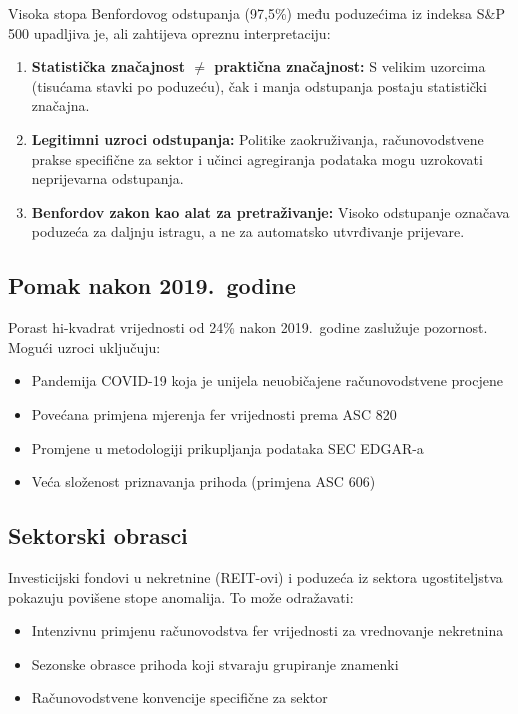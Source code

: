 \documentclass[12pt,a4paper]{article}
\begin{document}
Visoka stopa Benfordovog odstupanja (97,5\%) među poduzećima iz indeksa S\&P 500 upadljiva je, ali zahtijeva opreznu interpretaciju:

\begin{enumerate}
    \item \textbf{Statistička značajnost $\neq$ praktična značajnost:} S velikim uzorcima (tisućama stavki po poduzeću), čak i manja odstupanja postaju statistički značajna.

    \item \textbf{Legitimni uzroci odstupanja:} Politike zaokruživanja, računovodstvene prakse specifične za sektor i učinci agregiranja podataka mogu uzrokovati neprijevarna odstupanja.

    \item \textbf{Benfordov zakon kao alat za pretraživanje:} Visoko odstupanje označava poduzeća za daljnju istragu, a ne za automatsko utvrđivanje prijevare.
\end{enumerate}

\subsection{Pomak nakon 2019.\ godine}

Porast hi-kvadrat vrijednosti od 24\% nakon 2019.\ godine zaslužuje pozornost. Mogući uzroci uključuju:

\begin{itemize}
    \item Pandemija COVID-19 koja je unijela neuobičajene računovodstvene procjene
    \item Povećana primjena mjerenja fer vrijednosti prema ASC 820
    \item Promjene u metodologiji prikupljanja podataka SEC EDGAR-a
    \item Veća složenost priznavanja prihoda (primjena ASC 606)
\end{itemize}

\subsection{Sektorski obrasci}

Investicijski fondovi u nekretnine (REIT-ovi) i poduzeća iz sektora ugostiteljstva pokazuju povišene stope anomalija. To može odražavati:
\begin{itemize}
    \item Intenzivnu primjenu računovodstva fer vrijednosti za vrednovanje nekretnina
    \item Sezonske obrasce prihoda koji stvaraju grupiranje znamenki
    \item Računovodstvene konvencije specifične za sektor
\end{itemize}
\end{document}
